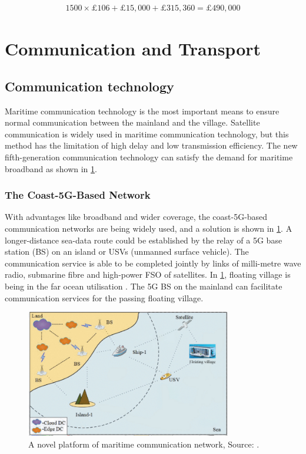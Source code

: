 \documentclass[11pt]{article}
\numberwithin{equation}{section}
\begin{document}
\begin{align}
\label{eqSomeCalc}
1500\times\pounds106 + \pounds15,000 + \pounds315,360 = \pounds 490,000
\end{align}

\section{Communication and Transport}
\label{sec:org6f9f4cc}
\subsection{Communication technology}
\label{sec:org17a40b5}
Maritime communication technology is the most important means to ensure normal communication between the mainland and the village.  Satellite communication is widely used in maritime communication technology, but this method has the limitation of high delay and low transmission efficiency. The new fifth-generation communication technology can satisfy the demand for maritime broadband as shown in \ref{A_novel_platform_of_maritime_communication_network}.

\subsubsection{The Coast-5G-Based Network}
\label{sec:org750f9e3}
With advantages like broadband and wider coverage, the coast-5G-based communication networks are being widely used, and a solution is shown in \ref{A_novel_platform_of_maritime_communication_network}. A longer-distance sea-data route could be established by the relay of a 5G base station (BS) on an island or USVs (unmanned surface vehicle). The communication service is able to be completed jointly by links of milli-metre wave radio, submarine fibre and high-power FSO of satellites.  In \ref{A_novel_platform_of_maritime_communication_network}, floating village is being in the far ocean utilisation \cite{10.1109/ISPA-BDCloud-SocialCom-SustainCom51426.2020.00190}. The 5G BS on the mainland can facilitate communication services for the passing floating village.

\begin{figure}[H]
\centering
\includegraphics[width=0.8\textwidth]{Figures/A_novel_platform_of_maritime_communication_network.jpg}
\caption{\label{A_novel_platform_of_maritime_communication_network}A novel platform of maritime communication network, Source: \cite{10.1109/ISPA-BDCloud-SocialCom-SustainCom51426.2020.00190}.}
\end{figure}
\end{document}
